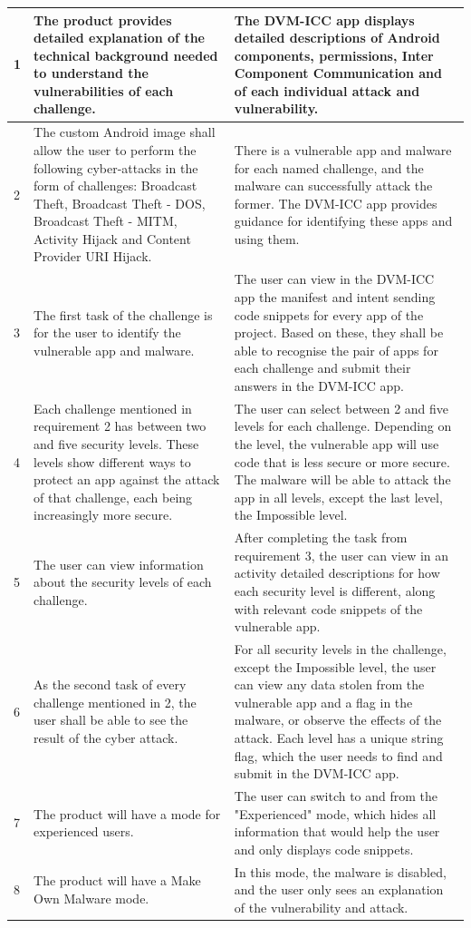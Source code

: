 \begin{center}
\begin{longtable}{|p{0.4cm} |p{5.7cm} |p{6.9cm} |}
         \hline
         1 & The product provides detailed explanation of the technical background needed to understand the vulnerabilities of each challenge. & The DVM-ICC app displays detailed descriptions of Android components, permissions, Inter Component Communication and of each individual attack and vulnerability. \\
         \hline
         2 & The custom Android image shall allow the user to perform the following cyber-attacks in the form of challenges: Broadcast Theft, Broadcast Theft - DOS, Broadcast Theft - MITM, Activity Hijack and Content Provider URI Hijack. & There is a vulnerable app and malware for each named challenge, and the malware can successfully attack the former. The DVM-ICC app provides guidance for identifying these apps and using them. \\
         \hline
         3 & The first task of the challenge is for the user to identify the vulnerable app and malware. & The user can view in the DVM-ICC app the manifest and intent sending code snippets for every app of the project. Based on these, they shall be able to recognise the pair of apps for each challenge and submit their answers in the DVM-ICC app. \\
         \hline
         4 & Each challenge mentioned in requirement 2 has between two and five security levels. These levels show different ways to protect an app against the attack of that challenge, each being increasingly more secure. & The user can select between 2 and five levels for each challenge. Depending on the level, the vulnerable app will use code that is less secure or more secure. The malware will be able to attack the app in all levels, except the last level, the Impossible level. \\
         \hline
         5 & The user can view information about the security levels of each challenge. & After completing the task from requirement 3, the user can view in an activity detailed descriptions for how each security level is different, along with relevant code snippets of the vulnerable app. \\
         \hline
         6 & As the second task of every challenge mentioned in 2, the user shall be able to see the result of the cyber attack. & For all security levels in the challenge, except the Impossible level, the user can view any data stolen from the vulnerable app and a flag in the malware, or observe the effects of the attack. Each level has a unique string flag, which the user needs to find and submit in the DVM-ICC app. \\
         \hline
         7 & The product will have a mode for experienced users. & The user can switch to and from the "Experienced" mode, which hides all information that would help the user and only displays code snippets. \\
         \hline
         8 & The product will have a Make Own Malware mode. & In this mode, the malware is disabled, and the user only sees an explanation of the vulnerability and attack. \\
         \hline
        \end{longtable}
    \end{center}
    

